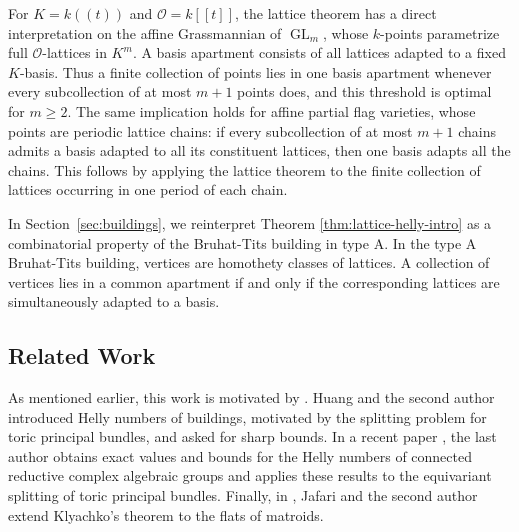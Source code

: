 \documentclass[12pt]{amsart}
\theoremstyle{definition}
\theoremstyle{remark}
\begin{document}
For $K=k((t))$ and $\mathcal O=k[[t]]$, the lattice theorem has a direct interpretation on the affine Grassmannian of $\operatorname{GL}_m$, whose $k$-points parametrize full $\mathcal O$-lattices in $K^m$. A basis apartment consists of all lattices adapted to a fixed $K$-basis. Thus a finite collection of points lies in one basis apartment whenever every subcollection of at most $m+1$ points does, and this threshold is optimal for $m\geq2$. The same implication holds for affine partial flag varieties, whose points are periodic lattice chains: if every subcollection of at most $m+1$ chains
admits a basis adapted to all its constituent lattices, then one basis adapts all the chains. This follows by applying the lattice theorem to the finite collection of lattices occurring in one period of each chain.

In Section~\ref{sec:buildings}, we reinterpret Theorem \ref{thm:lattice-helly-intro} as a combinatorial property of the Bruhat-Tits building in type A. In the type A Bruhat-Tits building, vertices are homothety classes of lattices. A collection of vertices lies in a common apartment if and only if the corresponding lattices are simultaneously adapted to a basis. %




\subsection*{Related Work}
As mentioned earlier, this work is motivated by \cite{Klyachko}. Huang and the second author \cite[\S6]{HK} introduced Helly numbers of buildings, motivated by the splitting problem for toric principal bundles, and asked for sharp bounds. In a recent paper \cite{Tsvelikhovskiy2026}, the last author obtains exact values and bounds for the Helly numbers of connected reductive complex algebraic groups and applies these results to the equivariant splitting of toric
principal bundles. Finally, in \cite{JK}, Jafari and the second author extend Klyachko's theorem to the flats of matroids.
\end{document}
